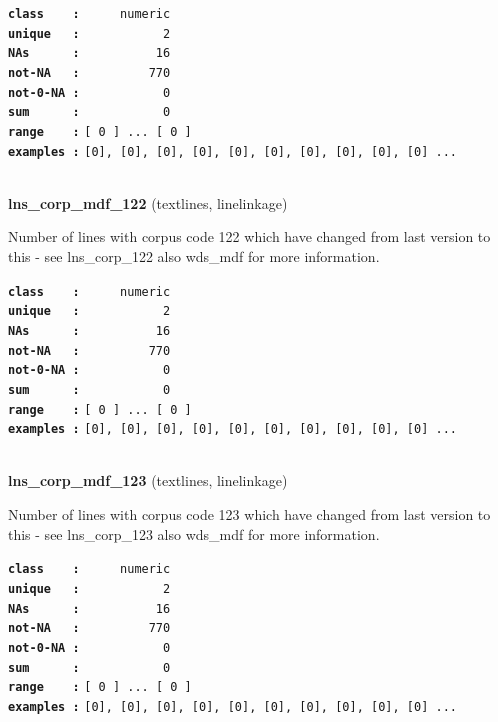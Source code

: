 \documentclass[]{article}
\begin{document}
\textbf{\texttt{class\ \ \ \ :}} \texttt{~~~~~numeric}\\
\textbf{\texttt{unique\ \ \ :}} \texttt{~~~~~~~~~~~2}\\
\textbf{\texttt{NAs\ \ \ \ \ \ :}} \texttt{~~~~~~~~~~16}\\
\textbf{\texttt{not-NA\ \ \ :}} \texttt{~~~~~~~~~770}\\
\textbf{\texttt{not-0-NA\ :}} \texttt{~~~~~~~~~~~0}\\
\textbf{\texttt{sum\ \ \ \ \ \ :}} \texttt{~~~~~~~~~~~0}\\
\textbf{\texttt{range\ \ \ \ :}}
\texttt{{[}\ 0\ {]}\ ...\ {[}\ 0\ {]}}\\
\textbf{\texttt{examples\ :}}
\texttt{{[}0{]},\ {[}0{]},\ {[}0{]},\ {[}0{]},\ {[}0{]},\ {[}0{]},\ {[}0{]},\ {[}0{]},\ {[}0{]},\ {[}0{]}\ ...}\\

~

\textbf{lns\_corp\_mdf\_122} (textlines, linelinkage)

Number of lines with corpus code 122 which have changed from last
version to this - see lns\_corp\_122 also wds\_mdf for more information.

\textbf{\texttt{class\ \ \ \ :}} \texttt{~~~~~numeric}\\
\textbf{\texttt{unique\ \ \ :}} \texttt{~~~~~~~~~~~2}\\
\textbf{\texttt{NAs\ \ \ \ \ \ :}} \texttt{~~~~~~~~~~16}\\
\textbf{\texttt{not-NA\ \ \ :}} \texttt{~~~~~~~~~770}\\
\textbf{\texttt{not-0-NA\ :}} \texttt{~~~~~~~~~~~0}\\
\textbf{\texttt{sum\ \ \ \ \ \ :}} \texttt{~~~~~~~~~~~0}\\
\textbf{\texttt{range\ \ \ \ :}}
\texttt{{[}\ 0\ {]}\ ...\ {[}\ 0\ {]}}\\
\textbf{\texttt{examples\ :}}
\texttt{{[}0{]},\ {[}0{]},\ {[}0{]},\ {[}0{]},\ {[}0{]},\ {[}0{]},\ {[}0{]},\ {[}0{]},\ {[}0{]},\ {[}0{]}\ ...}\\

~

\textbf{lns\_corp\_mdf\_123} (textlines, linelinkage)

Number of lines with corpus code 123 which have changed from last
version to this - see lns\_corp\_123 also wds\_mdf for more information.

\textbf{\texttt{class\ \ \ \ :}} \texttt{~~~~~numeric}\\
\textbf{\texttt{unique\ \ \ :}} \texttt{~~~~~~~~~~~2}\\
\textbf{\texttt{NAs\ \ \ \ \ \ :}} \texttt{~~~~~~~~~~16}\\
\textbf{\texttt{not-NA\ \ \ :}} \texttt{~~~~~~~~~770}\\
\textbf{\texttt{not-0-NA\ :}} \texttt{~~~~~~~~~~~0}\\
\textbf{\texttt{sum\ \ \ \ \ \ :}} \texttt{~~~~~~~~~~~0}\\
\textbf{\texttt{range\ \ \ \ :}}
\texttt{{[}\ 0\ {]}\ ...\ {[}\ 0\ {]}}\\
\textbf{\texttt{examples\ :}}
\texttt{{[}0{]},\ {[}0{]},\ {[}0{]},\ {[}0{]},\ {[}0{]},\ {[}0{]},\ {[}0{]},\ {[}0{]},\ {[}0{]},\ {[}0{]}\ ...}\\
\end{document}
